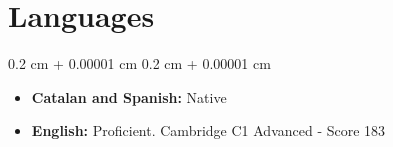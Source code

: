 \documentclass[10pt, letterpaper]{article}
\newenvironment{highlights}{
    \begin{itemize}[
        topsep=0.10 cm,
        parsep=0.10 cm,
        partopsep=0pt,
        itemsep=0pt,
        leftmargin=0.4 cm + 10pt
    ]
}{
    \end{itemize}
} %
\newenvironment{highlightsforbulletentries}{
    \begin{itemize}[
        topsep=0.10 cm,
        parsep=0.10 cm,
        partopsep=0pt,
        itemsep=0pt,
        leftmargin=10pt
    ]
}{
    \end{itemize}
} %
\newenvironment{onecolentry}{
    \begin{adjustwidth}{
        0.2 cm + 0.00001 cm
    }{
        0.2 cm + 0.00001 cm
    }
}{
    \end{adjustwidth}
} %
\newenvironment{twocolentry}[2][]{
    \onecolentry
    \def\secondColumn{#2}
    \setcolumnwidth{\fill, 4.5 cm}
    \begin{paracol}{2}
}{
    \switchcolumn \raggedleft \secondColumn
    \end{paracol}
    \endonecolentry
} %
\let\hrefWithoutArrow\href
\renewcommand{\href}[2]{\hrefWithoutArrow{#1}{\ifthenelse{\equal{#2}{}}{ }{#2 }\raisebox{.15ex}{\footnotesize \faExternalLink*}}}
\begin{document}


    



    \section{Languages}
        \begin{onecolentry}
            \begin{highlightsforbulletentries}
                \item \textbf{Catalan and Spanish:} Native
                \item \textbf{English:} Proficient. Cambridge C1 Advanced - Score 183
            \end{highlightsforbulletentries}
        \end{onecolentry}
\end{document}
